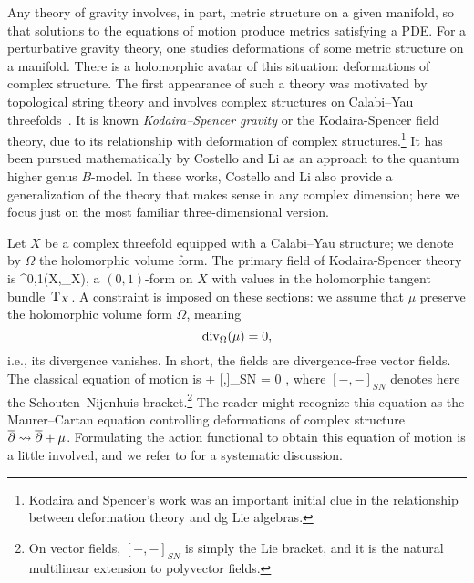 \documentclass[11pt]{amsart}
\begin{document}
Any theory of gravity involves, in part, metric structure on a given manifold,
so that solutions to the equations of motion produce metrics satisfying a PDE. 
For a perturbative gravity theory,
one studies deformations of some metric structure on a manifold.
There is a holomorphic avatar of this situation: deformations of complex structure. 
The first appearance of such a theory was motivated by topological string theory and involves complex structures on Calabi--Yau threefolds~\cite{BCOV}.
It is known \textit{Kodaira--Spencer gravity} or the Kodaira-Spencer field theory,
due to its relationship with deformation of complex structures.\footnote{Kodaira and Spencer's work was an important initial clue in the relationship between deformation theory and dg Lie algebras.}
It has been pursued mathematically by Costello and Li \cite{CLbcov1,CLbcov2,LiThesis} as an approach to the quantum higher genus $B$-model.
In these works, Costello and Li also provide a generalization of the theory that makes sense in any complex dimension; 
here we focus just on the most familiar three-dimensional version.

Let $X$ be a complex threefold equipped with a Calabi--Yau structure; we denote by $\Omega$ the holomorphic volume form.
The primary field of Kodaira-Spencer theory is 
\beqn
\mu \in \Omega^{0,1}(X,\T_X),
\eeqn 
a $(0,1)$-form  on $X$ with values in the holomorphic tangent bundle~${\rm T}_X$.
A constraint is imposed on these sections:
we assume that $\mu$ preserve the holomorphic volume form $\Omega$, meaning 
\[
{\rm div}_\Omega(\mu) = 0,
\]
i.e., its divergence vanishes.
In short, the fields are divergence-free vector fields.
The classical equation of motion is 
\beqn
\dbar \mu +  [\mu,\mu]_{SN} = 0 ,
\eeqn
where $[-,-]_{SN}$ denotes here the Schouten--Nijenhuis bracket.\footnote{On vector fields, $[-,-]_{SN}$ is simply the Lie bracket, and it is the natural multilinear extension to polyvector fields.}
The reader might recognize this equation as the Maurer--Cartan equation controlling deformations of complex structure ${\overline{\partial}}\rightsquigarrow {\overline{\partial}} + \mu$.
Formulating the action functional to obtain this equation of motion is a little involved, 
and we refer to \cite{CLbcov1} for a systematic discussion.
\end{document}
